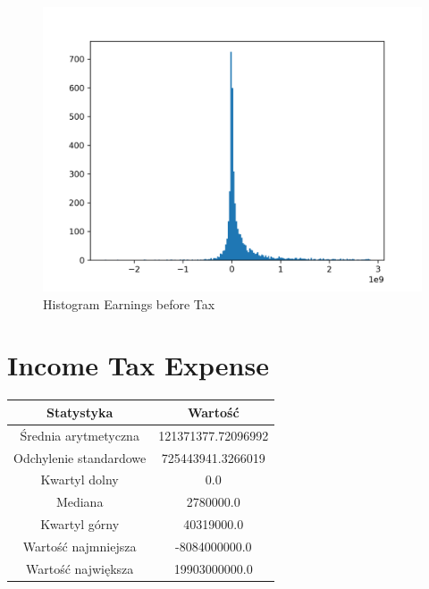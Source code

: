 \documentclass{article}
\begin{document}
\begin{figure}[h!]
    \includegraphics[width=\linewidth]{variables/Earnings before Tax.png}
    \caption{Histogram Earnings before Tax }
\end{figure}\section{ Income Tax Expense }

\begin{center}
    \begin{tabular}{|c | c|} 
    \hline
    Statystyka & Wartość \\
    \hline\hline
    Średnia arytmetyczna & 121371377.72096992 \\ 
    \hline
    Odchylenie standardowe & 725443941.3266019 \\
    \hline
    Kwartyl dolny & 0.0 \\
    \hline
    Mediana & 2780000.0 \\
    \hline
    Kwartyl górny & 40319000.0 \\
    \hline
    Wartość najmniejsza & -8084000000.0 \\
    \hline
    Wartość największa & 19903000000.0 \\
    \hline
   \end{tabular}
\end{center}
\end{document}
